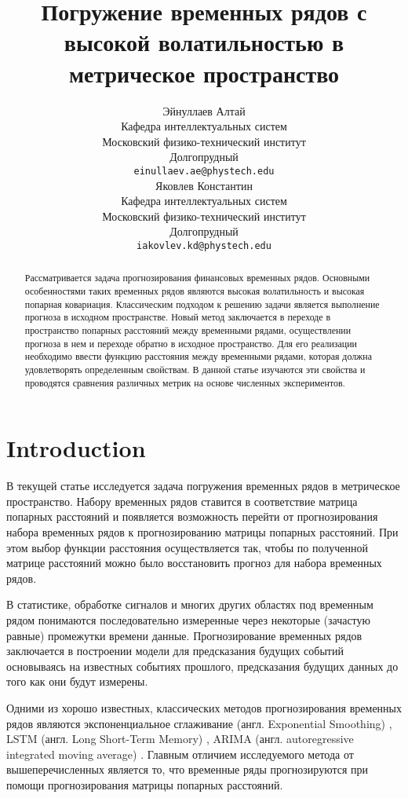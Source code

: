 \documentclass{article}
\title{Погружение временных рядов с высокой волатильностью в метрическое пространство}
\author{ Эйнуллаев Алтай \\
	Кафедра интеллектуальных систем\\
	Московский физико-технический институт\\
	Долгопрудный \\
	\texttt{einullaev.ae@phystech.edu} \\
	\And
	Яковлев Константин \\
	Кафедра интеллектуальных систем\\
	Московский физико-технический институт\\
	Долгопрудный \\
	\texttt{iakovlev.kd@phystech.edu} \\
}
\date{}
\begin{document}
\maketitle

\begin{abstract}
	Рассматривается задача прогнозирования финансовых временных рядов. Основными особенностями таких временных рядов являются высокая волатильность и высокая попарная ковариация. Классическим подходом к решению задачи является выполнение прогноза в исходном пространстве. Новый метод заключается в переходе в пространство попарных расстояний между временными рядами, осуществлении прогноза в нем и переходе обратно в исходное пространство. Для его реализации необходимо ввести функцию расстояния между временными рядами, которая должна удовлетворять определенным свойствам. В данной статье изучаются  эти свойства и проводятся сравнения различных метрик на основе численных экспериментов.

\end{abstract}



\section{Introduction}

В текущей статье исследуется задача погружения временных рядов в метрическое пространство. Набору временных рядов ставится в соответствие матрица попарных расстояний и появляется возможность перейти от прогнозирования набора временных рядов к прогнозированию матрицы попарных расстояний. При этом выбор функции расстояния осуществляется так, чтобы по полученной матрице расстояний можно было восстановить прогноз для набора временных рядов.

В статистике, обработке сигналов и многих других областях под временным рядом понимаются последовательно измеренные через некоторые (зачастую равные) промежутки времени данные. \cite{shumway2000time} Прогнозирование временных рядов заключается в построении модели для предсказания будущих событий основываясь на известных событиях прошлого, предсказания будущих данных до того как они будут измерены.

Одними из хорошо известных, классических методов прогнозирования временных рядов являются экспоненциальное сглаживание (англ. Exponential Smoothing) \cite{ES}, LSTM (англ. Long Short-Term Memory) \cite{LSTM}, ARIMA  (англ. autoregressive integrated moving average) \cite{ARIMA}. Главным отличием исследуемого метода от вышеперечисленных является то, что временные ряды прогнозируются при помощи прогнозирования матрицы попарных расстояний.
\end{document}
